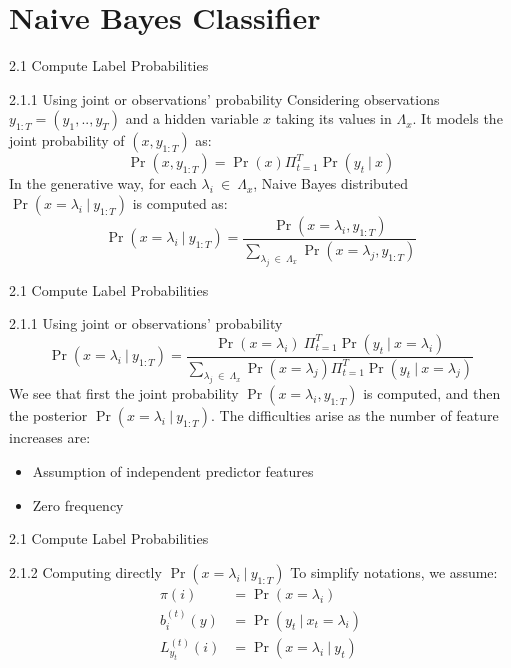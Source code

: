 \documentclass{beamer}
\providecommand{\pr}[1]{\ensuremath{\Pr\left(#1\right)}}
\begin{document}
\section{Naive Bayes Classifier}
\begin{frame}{2.1 Compute Label Probabilities}
\begin{block}{2.1.1 Using joint or observations' probability}
Considering observations $y_{1:T} = (y_1,..,y_T)$ and a hidden variable $x$ taking its values in $\Lambda_x$. It models the joint probability of $(x,y_{1:T})$ as:
\begin{equation}
    \pr{x,y_{1:T}} = \pr{x}\Pi_{t=1}^{T}\pr{y_t\ |\ x}
\end{equation}
In the generative way, for each $\lambda_i\ \in\ \Lambda_x$, Naive Bayes distributed $\pr{x=\lambda_i\ |\ y_{1:T}}$ is computed as:
\begin{equation}
    \pr{x=\lambda_i\ |\ y_{1:T}} = \dfrac{\pr{x=\lambda_i, y_{1:T}}}{\sum_{\lambda_j\ \in\ \Lambda_x} \pr{x=\lambda_j, y_{1:T}}}
\end{equation}
\end{block}
\end{frame}
\begin{frame}{2.1 Compute Label Probabilities}
\begin{block}{2.1.1 Using joint or observations' probability}
\begin{equation}
    \pr{x=\lambda_i\ |\ y_{1:T}} = \dfrac{\pr{x=\lambda_i}\ \Pi_{t=1}^{T}\pr{y_t\ |\ x=\lambda_i}}{\sum_{\lambda_j\ \in\ \Lambda_x}\pr{x=\lambda_j}\Pi_{t=1}^{T}\pr{y_t\ |\ x=\lambda_j}}
\end{equation}
We see that first the joint probability $\pr{x = \lambda_i, y_{1:T}}$ is computed, and then the posterior $\pr{x = \lambda_i\ |\ y_{1:T}}$. The difficulties arise as the number of feature increases are:
\begin{itemize}
    \item Assumption of independent predictor features
    \item Zero frequency
\end{itemize}
\end{block}
\end{frame}
\begin{frame}{2.1 Compute Label Probabilities}
\begin{block}{2.1.2 Computing directly $\pr{x = \lambda_i\ |\ y_{1:T}}$}
    To simplify notations, we assume:
    \begin{equation}
        \begin{split}
            \pi(i) &= \pr{x = \lambda_i}\\
            b_{i}^{(t)}(y) &= \pr{y_t\ |\ x_t = \lambda_i}\\
            L_{y_t}^{(t)}(i) &= \pr{x = \lambda_i\ |\ y_t}\\
        \end{split}
    \end{equation}
\end{block}
\end{frame}
\end{document}
